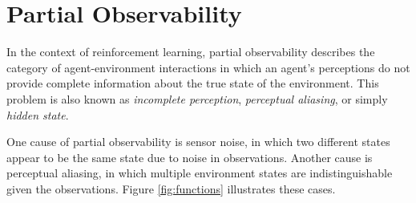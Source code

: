 \documentclass{article} %
\theoremstyle{definition}
\begin{document}
\section{Partial Observability}
In the context of reinforcement learning, partial observability
describes the category of agent-environment interactions in which an
agent's perceptions do not provide complete information about the true
state of the environment. This problem is also known as
\textit{incomplete perception}, \textit{perceptual aliasing}, or
simply \textit{hidden state}.

One cause of partial observability is sensor noise, in which two
different states appear to be the same state due to noise in
observations. Another cause is perceptual aliasing, in which multiple
environment states are indistinguishable given the
observations. Figure \ref{fig:functions} illustrates these cases.
\end{document}
